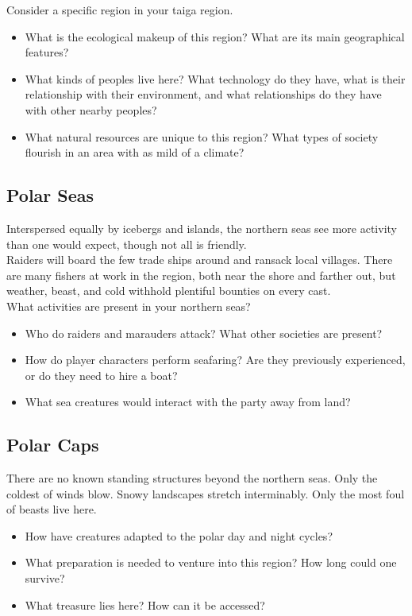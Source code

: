 \documentclass[notitlepage]{article}
\begin{document}
\begin{multicols}{2}
Consider a specific region in your taiga region.

\begin{itemize}
\item What is the ecological makeup of this region? What are its main geographical features?
\item What kinds of peoples live here? What technology do they have, what is their relationship with their environment, and what relationships do they have with other nearby peoples?
\item What natural resources are unique to this region? What types of society flourish in an area with as mild of a climate?
\end{itemize}

\subsection*{Polar Seas}

Interspersed equally by icebergs and islands, the northern seas see more activity than one would expect, though not all is friendly. \\

Raiders will board the few trade ships around and ransack local villages. There are many fishers at work in the region, both near the shore and farther out, but weather, beast, and cold withhold plentiful bounties on every cast. \\

What activities are present in your northern seas?

\begin{itemize}
\item Who do raiders and marauders attack? What other societies are present?
\item How do player characters perform seafaring? Are they previously experienced, or do they need to hire a boat?
\item What sea creatures would interact with the party away from land?
\end{itemize}

\subsection*{Polar Caps}

There are no known standing structures beyond the northern seas. Only the coldest of winds blow. Snowy landscapes stretch interminably. Only the most foul of beasts live here.

\begin{itemize}
\item How have creatures adapted to the polar day and night cycles?
\item What preparation is needed to venture into this region? How long could one survive?
\item What treasure lies here? How can it be accessed?
\end{itemize}


\end{multicols}
\end{document}
